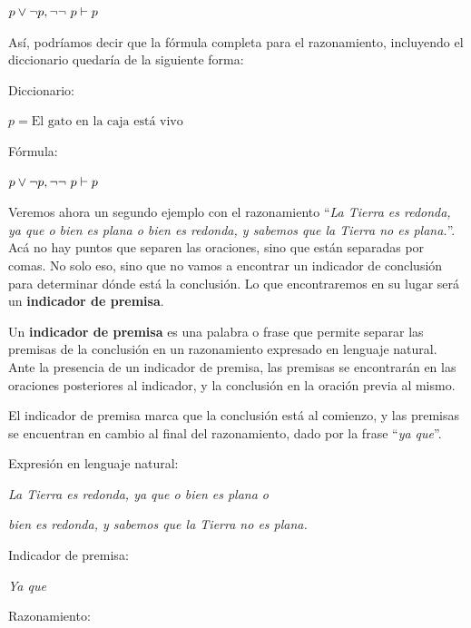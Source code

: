 \begin{example}
    \dindent $p \lor \lnot p, \lnot \lnot ~ p \vdash p$
\end{example}

Así, podríamos decir que la fórmula completa para el razonamiento, incluyendo el
diccionario quedaría de la siguiente forma:

\begin{example}
    \sindent Diccionario:

    \dindent $p = \text{El gato en la caja está vivo}$

    \sindent Fórmula:

    \dindent $p \lor \lnot p, \lnot \lnot ~ p \vdash p$
\end{example}

Veremos ahora un segundo ejemplo con el razonamiento ``\textit{La Tierra es
redonda, ya que o bien es plana o bien es redonda, y sabemos que la Tierra no es
plana.}''. Acá no hay puntos que separen las oraciones, sino que están separadas
por comas. No solo eso, sino que no vamos a encontrar un indicador de conclusión
para determinar dónde está la conclusión. Lo que encontraremos en su lugar será
un \textbf{indicador de premisa}.

\begin{definition}
    Un \textbf{indicador de premisa} es una palabra
    o frase que permite separar las premisas de la conclusión en un razonamiento
    expresado en lenguaje natural. Ante la presencia de un indicador de premisa,
    las premisas se encontrarán en las oraciones posteriores al indicador, y la
    conclusión en la oración previa al mismo.
\end{definition}

El indicador de premisa marca que la conclusión está al comienzo, y las premisas
se encuentran en cambio al final del razonamiento, dado por la frase
``\textit{ya que}''.

\begin{example}
    \sindent Expresión en lenguaje natural:

    \dindent \textit{La Tierra es redonda, ya que o bien es plana o}

    \dindent \textit{bien es redonda, y sabemos que la Tierra no es plana.}

    \sindent Indicador de premisa:

    \dindent \textit{Ya que}

    \sindent Razonamiento:

    \begin{lreasoning}[width=0.6\textwidth,margin=\value{dindentwidth} pt]
         
    \end{lreasoning}
\end{example}

